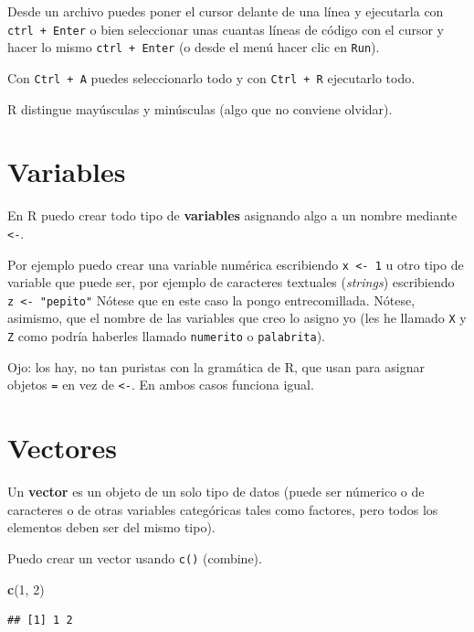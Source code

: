 \documentclass[]{book}
\newenvironment{Shaded}{\begin{snugshade}}{\end{snugshade}}
\newcommand{\DecValTok}[1]{\textcolor[rgb]{0.00,0.00,0.81}{#1}}
\newcommand{\KeywordTok}[1]{\textcolor[rgb]{0.13,0.29,0.53}{\textbf{#1}}}
\newcommand{\NormalTok}[1]{#1}
\theoremstyle{definition}
\theoremstyle{definition}
\theoremstyle{definition}
\theoremstyle{remark}
\begin{document}
Desde un archivo puedes poner el cursor delante de una línea y
ejecutarla con \texttt{ctrl\ +\ Enter} o bien seleccionar unas cuantas
líneas de código con el cursor y hacer lo mismo \texttt{ctrl\ +\ Enter}
(o desde el menú hacer clic en \texttt{Run}).

Con \texttt{Ctrl\ +\ A} puedes seleccionarlo todo y con
\texttt{Ctrl\ +\ R} ejecutarlo todo.

R distingue mayúsculas y minúsculas (algo que no conviene olvidar).

\hypertarget{variables}{%
\section{Variables}\label{variables}}

En R puedo crear todo tipo de \textbf{variables} asignando algo a un
nombre mediante \texttt{\textless{}-}.

Por ejemplo puedo crear una variable numérica escribiendo
\texttt{x\ \textless{}-\ 1} u otro tipo de variable que puede ser, por
ejemplo de caracteres textuales (\emph{strings}) escribiendo
\texttt{z\ \textless{}-\ "pepito"} Nótese que en este caso la pongo
entrecomillada. Nótese, asimismo, que el nombre de las variables que
creo lo asigno yo (les he llamado \texttt{X} y \texttt{Z} como podría
haberles llamado \texttt{numerito} o \texttt{palabrita}).

Ojo: los hay, no tan puristas con la gramática de R, que usan para
asignar objetos \texttt{=} en vez de \texttt{\textless{}-}. En ambos
casos funciona igual.

\hypertarget{vectores}{%
\section{Vectores}\label{vectores}}

Un \textbf{vector} es un objeto de un solo tipo de datos (puede ser
númerico o de caracteres o de otras variables categóricas tales como
factores, pero todos los elementos deben ser del mismo tipo).

Puedo crear un vector usando \texttt{c()} (combine).

\begin{Shaded}
\begin{Highlighting}[]
\KeywordTok{c}\NormalTok{(}\DecValTok{1}\NormalTok{, }\DecValTok{2}\NormalTok{)}
\end{Highlighting}
\end{Shaded}

\begin{verbatim}
## [1] 1 2
\end{verbatim}
\end{document}
